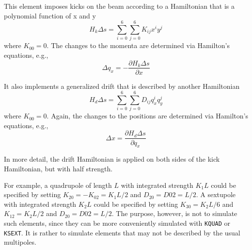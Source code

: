 This element imposes kicks on the beam according
to a Hamiltonian that is a polynomial function of x and y 
\begin{equation}
H_k\Delta s = \sum_{i=0}^{6} \sum_{j=0}^{6} K_{ij} x^i y^j 
\end{equation}
where $K_{00} = 0$.
The changes to the momenta are determined via Hamilton's equations, e.g.,
\begin{equation}
\Delta q_x = -\frac{\partial H_k\Delta s}{\partial x}
\end{equation}

It also implements a generalized drift that is described by another Hamiltonian
\begin{equation}
H_d\Delta s = \sum_{i=0}^{6} \sum_{j=0}^{6} D_{ij} q_x^i q_y^j 
\end{equation}
where $K_{00} = 0$.
Again, the changes to the positions are determined via Hamilton's equations, e.g., 
\begin{equation}
\Delta x = \frac{\partial H_d\Delta s}{\partial q_x}
\end{equation}

In more detail, the drift Hamiltonian is applied on both sides of the kick Hamiltonian, but with
half strength. 

For example, a quadrupole of length $L$ with integrated strength $K_1 L$  could be specified by setting
$K_{20} = -K_{02} = K_1 L/2$ and $D_20 = D02 = L/2$.
A sextupole with integrated strength $K_2 L$ could be specified by setting $K_{30} = K_2 L/6$ and $K_{12} = K_2 L/2$
and $D_20 = D02 = L/2$.
The purpose, however, is not to simulate such elements, since they can be more conveniently simulated with 
\verb|KQUAD| or \verb|KSEXT|.
It is rather to simulate elements that may not be described by the usual multipoles.